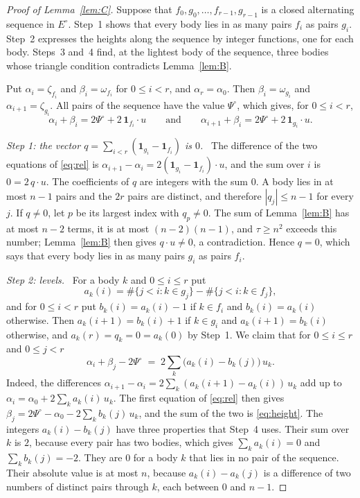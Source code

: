 \documentclass[11pt]{amsart}
\theoremstyle{definition}
\theoremstyle{remark}
\numberwithin{equation}{section}
\newcommand{\Po}{\Psi^{\circ}}
\newcommand{\Eo}{E^{\circ}}
\newcommand{\one}[1]{\mathbf{1}_{#1}}
\newcommand{\step}[1]{\smallskip\noindent\textit{#1}\ }
\begin{document}
\begin{proof}[Proof of Lemma~\ref{lem:C}]
Suppose that $f_0, g_0, \dots, f_{r-1}, g_{r-1}$ is a closed alternating sequence in $\Eo$. Step~1
shows that every body lies in as many pairs $f_i$ as pairs $g_i$. Step~2 expresses the heights along
the sequence by integer functions, one for each body. Steps~3 and~4 find, at the lightest body of the
sequence, three bodies whose triangle condition contradicts Lemma~\ref{lem:B}.

Put $\alpha_i = \zeta_{f_i}$ and $\beta_i = \omega_{f_i}$ for $0 \le i < r$, and $\alpha_r = \alpha_0$.
Then $\beta_i = \omega_{g_i}$ and $\alpha_{i+1} = \zeta_{g_i}$. All pairs of the sequence have the value
$\Po$, which gives, for $0 \le i < r$,
\begin{equation}\label{eq:rel}
  \alpha_i + \beta_i = 2\Po + 2\, \one{f_i} \cdot u
  \qquad\text{and}\qquad
  \alpha_{i+1} + \beta_i = 2\Po + 2\, \one{g_i} \cdot u .
\end{equation}

\step{Step 1: the vector $q = \sum_{i < r} (\one{g_i} - \one{f_i})$ is $0$.} The difference of the two
equations of \eqref{eq:rel} is $\alpha_{i+1} - \alpha_i = 2 (\one{g_i} - \one{f_i}) \cdot u$, and the
sum over $i$ is $0 = 2\, q \cdot u$. The coefficients of $q$ are integers with the sum $0$. A body lies
in at most $n - 1$ pairs and the $2r$ pairs are distinct, and therefore $|q_j| \le n - 1$ for every $j$.
If $q \ne 0$, let $p$ be its largest index with $q_p \ne 0$. The sum of Lemma~\ref{lem:B} has at most
$n - 2$ terms, it is at most $(n - 2)(n - 1)$, and $\tau \ge n^2$ exceeds this number; Lemma~\ref{lem:B}
then gives $q \cdot u \ne 0$, a contradiction. Hence $q = 0$, which says that every body lies in as
many pairs $g_i$ as pairs $f_i$.

\step{Step 2: levels.} For a body $k$ and $0 \le i \le r$ put
\[
  a_k(i) = \#\{ j < i : k \in g_j \} - \#\{ j < i : k \in f_j \} ,
\]
and for $0 \le i < r$ put $b_k(i) = a_k(i) - 1$ if $k \in f_i$ and $b_k(i) = a_k(i)$ otherwise. Then
$a_k(i + 1) = b_k(i) + 1$ if $k \in g_i$ and $a_k(i + 1) = b_k(i)$ otherwise, and
$a_k(r) = q_k = 0 = a_k(0)$ by Step~1. We claim that for $0 \le i \le r$ and $0 \le j < r$
\begin{equation}\label{eq:height}
  \alpha_i + \beta_j - 2\Po \;=\; 2 \sum_{k} \bigl( a_k(i) - b_k(j) \bigr)\, u_k .
\end{equation}
Indeed, the differences $\alpha_{i+1} - \alpha_i = 2 \sum_k (a_k(i+1) - a_k(i))\, u_k$ add up to
$\alpha_i = \alpha_0 + 2 \sum_k a_k(i)\, u_k$. The first equation of \eqref{eq:rel} then gives
$\beta_j = 2\Po - \alpha_0 - 2 \sum_k b_k(j)\, u_k$, and the sum of the two is \eqref{eq:height}. The
integers $a_k(i) - b_k(j)$ have three properties that Step~4 uses. Their sum over $k$ is $2$, because every pair
has two bodies, which gives $\sum_k a_k(i) = 0$ and $\sum_k b_k(j) = -2$. They are $0$ for a body $k$
that lies in no pair of the sequence. Their absolute value is at most $n$, because $a_k(i) - a_k(j)$ is
a difference of two numbers of distinct pairs through $k$, each between $0$ and $n - 1$.


\end{proof}
\end{document}
